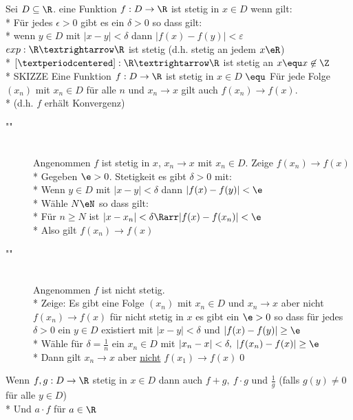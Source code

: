 \wdh
Sei $D \subseteq \R$. eine Funktion $f: D \to \R$ ist stetig in $x \in D$ wenn gilt:\\*
Für jedes $\epsilon > 0$ gibt es ein $\delta > 0$ so dass gilt: \\*
wenn $y \in D$ mit $|x - y| < \delta$ dann $|f(x) - f(y)| < ε$
\bsp
$exp:\R→\R$ ist stetig (d.h. stetig an jedem $x\eR$)\\*
$[·]:\R→\R$ ist stetig an $x \equ x\not\in\Z$\\*
SKIZZE %
%
Eine Funktion $f: D \to \R$ ist stetig in $x \in D$ $\equ$ Für jede Folge $(x_n)$ mit $x_n \in D$ für alle $n$ und $x_n \to x$ gilt auch $f(x_n) \to f(x)$.\\*
(d.h. $f$ erhält Konvergenz)
\bew
\begin{description}
\item["\Rarr"]{\hfill\\Angenommen $f$ ist stetig in $x$, $x_n→x$ mit $x_n\in D$. Zeige $f(x_n)→f(x)$\\*
Gegeben $\e>0$. Stetigkeit \Rarr{} es gibt $\delta>0$ mit:\\*
Wenn $y\in D$ mit $|x-y|<\delta$ dann $|f(x)-f(y)|<\e$\\*
Wähle $N\eN$ so dass gilt:\\*
Für $n\geq N$ ist $|x-x_n|<\delta \Rarr |f(x)-f(x_n)|<\e$\\*
Also gilt $f(x_n)→f(x)$}
\item["\Larr"]{\hfill\\Angenommen $f$ ist nicht stetig.\\*
Zeige: Es gibt eine Folge $(x_n)$ mit $x_n\in D$ und $x_n→x$ aber nicht $f(x_n)→f(x)$ für nicht stetig in $x$ \Rarr{} es gibt ein $\e>0$ so dass für jedes $\delta>0$ ein $y\in D$ existiert mit $|x-y|<\delta$ und $|f(x)-f(y)|\geq \e$\\*
Wähle für $\delta=\frac{1}{n}$ ein $x_n\in D$ mit $|x_n-x|<\delta,\ |f(x_n)-f(x)|\geq\e$\\*
Dann gilt $x_n→x$ aber \ul{nicht} $f(x_1)→f(x)$\qed}
\end{description}
%
\wdh
{}
Wenn $f, g: D \to \R$ stetig in $x \in D$ dann auch $f + g,\ f · g$ und $\frac{1}{g}$ (falls $g(y) \neq 0$ für alle $y \in D$) \\*
Und $a \cdot f$ für $a \in \R$


